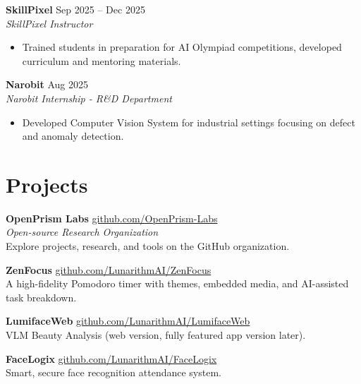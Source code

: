 \documentclass[11pt,a4paper]{article}
\begin{document}
\vspace{5pt}

\noindent \textbf{SkillPixel} \hfill Sep 2025 -- Dec 2025\\
\textit{SkillPixel Instructor}
\begin{itemize}[leftmargin=*, parsep=0pt, itemsep=2pt, topsep=2pt]
    \item Trained students in preparation for AI Olympiad competitions, developed curriculum and mentoring materials.
\end{itemize}

\vspace{5pt}

\noindent \textbf{Narobit} \hfill Aug 2025\\
\textit{Narobit Internship - R\&D Department}
\begin{itemize}[leftmargin=*, parsep=0pt, itemsep=2pt, topsep=2pt]
    \item Developed Computer Vision System for industrial settings focusing on defect and anomaly detection.
\end{itemize}

\section{Projects}
\noindent \textbf{OpenPrism Labs} \hfill \href{https://github.com/OpenPrism-Labs}{github.com/OpenPrism-Labs}\\
\textit{Open-source Research Organization}\\
Explore projects, research, and tools on the GitHub organization.

\vspace{5pt}

\noindent \textbf{ZenFocus} \hfill \href{https://github.com/LunarithmAI/ZenFocus}{github.com/LunarithmAI/ZenFocus}\\
A high-fidelity Pomodoro timer with themes, embedded media, and AI-assisted task breakdown.

\vspace{5pt}

\noindent \textbf{LumifaceWeb} \hfill \href{https://github.com/LunarithmAI/LumifaceWeb}{github.com/LunarithmAI/LumifaceWeb}\\
VLM Beauty Analysis (web version, fully featured app version later).

\vspace{5pt}

\noindent \textbf{FaceLogix} \hfill \href{https://github.com/LunarithmAI/FaceLogix}{github.com/LunarithmAI/FaceLogix}\\
Smart, secure face recognition attendance system.
\end{document}
